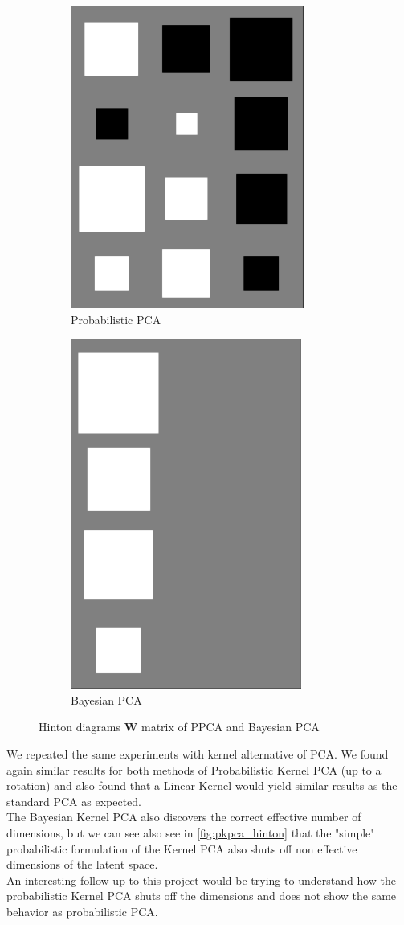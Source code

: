 \documentclass{article}
\begin{document}
\begin{figure}[ht]
    \centering
    \begin{subfigure}{.5\textwidth}
      \centering
      \includegraphics[width=.4\linewidth]{img/hinton_ppca.png}
      \caption{Probabilistic PCA}
      \label{fig:ppca_hinton}
    \end{subfigure}%
    \begin{subfigure}{.5\textwidth}
      \centering
      \includegraphics[width=.4\linewidth]{img/hinton_bayesian.png}
      \caption{Bayesian PCA}
      \label{fig:bayes_hinton}
    \end{subfigure}
    \caption{Hinton diagrams $\mathbf{W}$ matrix of PPCA and Bayesian PCA}
    \label{fig:hinton_pca}
\end{figure}

We repeated the same experiments with kernel alternative of PCA. We found again similar results for both methods of Probabilistic Kernel PCA  (up to a rotation) and also found that a Linear Kernel would yield similar results as the standard PCA as expected.\\
The Bayesian Kernel PCA also discovers the correct effective number of dimensions, but we can see also see in \ref{fig:pkpca_hinton} that the "simple" probabilistic formulation of the Kernel PCA also shuts off non effective dimensions of the latent space.\\
An interesting follow up to this project would be trying to understand how the probabilistic Kernel PCA shuts off the dimensions and does not show the same behavior as probabilistic PCA.
\end{document}
